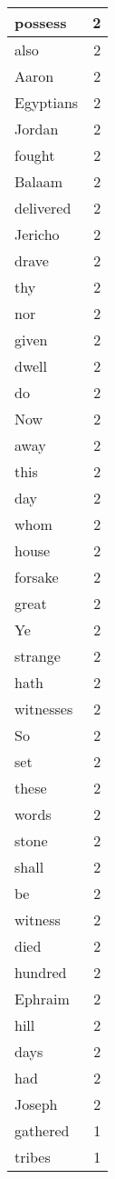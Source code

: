 \begin{center}
\begin{longtable}{l|r}
possess & 2\\ \hline 
also & 2\\ \hline 
Aaron & 2\\ \hline 
Egyptians & 2\\ \hline 
Jordan & 2\\ \hline 
fought & 2\\ \hline 
Balaam & 2\\ \hline 
delivered & 2\\ \hline 
Jericho & 2\\ \hline 
drave & 2\\ \hline 
thy & 2\\ \hline 
nor & 2\\ \hline 
given & 2\\ \hline 
dwell & 2\\ \hline 
do & 2\\ \hline 
Now & 2\\ \hline 
away & 2\\ \hline 
this & 2\\ \hline 
day & 2\\ \hline 
whom & 2\\ \hline 
house & 2\\ \hline 
forsake & 2\\ \hline 
great & 2\\ \hline 
Ye & 2\\ \hline 
strange & 2\\ \hline 
hath & 2\\ \hline 
witnesses & 2\\ \hline 
So & 2\\ \hline 
set & 2\\ \hline 
these & 2\\ \hline 
words & 2\\ \hline 
stone & 2\\ \hline 
shall & 2\\ \hline 
be & 2\\ \hline 
witness & 2\\ \hline 
died & 2\\ \hline 
hundred & 2\\ \hline 
Ephraim & 2\\ \hline 
hill & 2\\ \hline 
days & 2\\ \hline 
had & 2\\ \hline 
Joseph & 2\\ \hline 
gathered & 1\\ \hline 
tribes & 1\\ \hline 

\end{longtable}
\end{center}
